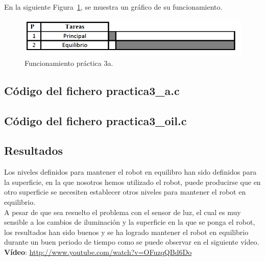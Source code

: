 En la siguiente Figura~\ref{grafico3a}, se muestra un gráfico de su funcionamiento.

\begin{figure}[H]
 \centering
 \includegraphics[scale=0.4]{./img/grafico3a.png}
 \caption{Funcionamiento práctica 3a.}
 \label{grafico3a}
\end{figure}

\subsection{Código del fichero practica3\_a.c}


\subsection{Código del fichero practica3\_oil.c}


\subsection{Resultados}
Los niveles definidos para mantener el robot en equilibro han sido definidos para la superficie, en la que nosotros hemos utilizado el robot, puede producirse que en otro superficie se necesiten establecer otros niveles para mantener el robot en equilibrio.\\

A pesar de que sea resuelto el problema con el sensor de luz, el cual es muy sensible a los cambios de iluminación y la superficie en la que se ponga el robot, los resultados han sido buenos y se ha logrado mantener el robot en equilibrio durante un buen periodo de tiempo como se puede observar en el siguiente vídeo.\\

\textbf{Vídeo}: \url{http://www.youtube.com/watch?v=OFuzqQBd6Do} 